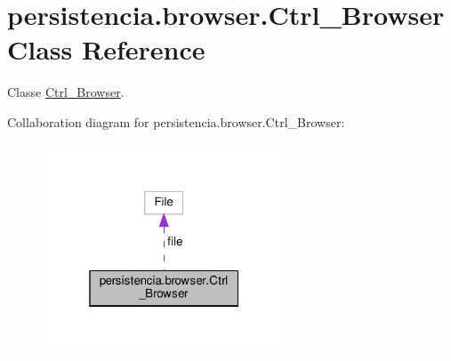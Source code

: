\hypertarget{classpersistencia_1_1browser_1_1Ctrl__Browser}{}\section{persistencia.\+browser.\+Ctrl\+\_\+\+Browser Class Reference}
\label{classpersistencia_1_1browser_1_1Ctrl__Browser}


Classe \hyperlink{classpersistencia_1_1browser_1_1Ctrl__Browser}{Ctrl\+\_\+\+Browser}.  




Collaboration diagram for persistencia.\+browser.\+Ctrl\+\_\+\+Browser\+:\nopagebreak
\begin{figure}[H]
\begin{center}
\leavevmode
\includegraphics[width=205pt]{classpersistencia_1_1browser_1_1Ctrl__Browser__coll__graph}
\end{center}
\end{figure}
